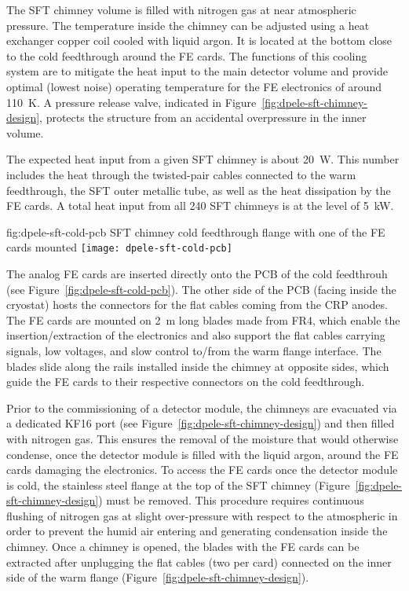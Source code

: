 The SFT chimney volume is filled with nitrogen gas at near atmospheric pressure. The temperature inside the chimney can be adjusted using a heat exchanger copper coil cooled with liquid argon. It is located at the bottom close to the cold feedthrough around the FE cards. The functions of this cooling system are to mitigate the heat input to the main detector volume and provide optimal (lowest noise) operating temperature for the FE electronics of around \SI{110}{K}. A pressure release valve, indicated in Figure~\ref{fig:dpele-sft-chimney-design}, protects the structure from an accidental overpressure in the inner volume. 

The expected heat input from a given SFT chimney is about \SI{20}{\watt}. This number includes the heat through the twisted-pair cables connected to the warm feedthrough, the SFT outer metallic tube, as well as the heat dissipation by the FE cards. A total heat input from all \num{240} SFT chimneys is at the level of \SI{5}{\kilo\watt}. 

\begin{dunefigure}{fig:dpele-sft-cold-pcb}
{SFT chimney cold feedthrough flange with one of the FE cards mounted}
\texttt{[image: dpele-sft-cold-pcb]}
\end{dunefigure}

The analog FE cards are inserted directly onto the PCB of the cold feedthrouh (see Figure~\ref{fig:dpele-sft-cold-pcb}). The other side of the PCB (facing inside the cryostat) hosts the connectors for the flat cables coming from the CRP anodes.  The FE cards are mounted on \SI{2}{m} long blades made from FR4, which enable the insertion/extraction of the electronics and also support the flat cables carrying signals, low voltages, and slow control to/from the warm flange interface.  The blades slide along the rails installed inside the chimney at opposite sides, which guide the FE cards to their respective connectors on the cold feedthrough. 

Prior to the commissioning of a detector module, the chimneys are evacuated via a dedicated KF16 port (see Figure~\ref{fig:dpele-sft-chimney-design}) and then filled with nitrogen gas. This ensures the removal of the moisture that would otherwise condense, once the detector module is filled with the liquid argon, around the FE cards damaging the electronics. To access the FE cards once the detector module is cold, the stainless steel flange at the top of the SFT chimney (Figure~\ref{fig:dpele-sft-chimney-design}) must be removed. This procedure requires continuous flushing of nitrogen gas at slight over-pressure with respect to the atmospheric in order to prevent the humid air entering and generating condensation inside the chimney. Once a chimney is opened, the blades with the FE cards can be extracted after unplugging the flat cables (two per card) connected on the inner side of the warm flange (Figure~\ref{fig:dpele-sft-chimney-design}).

